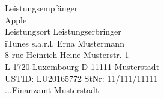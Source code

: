 \documentclass{article}
\begin{document}
\noindent
\pagestyle{empty}
Leistungsempfänger\\
Apple\\
Leistungsort \hfill Leistungserbringer\\
iTunes s.a.r.l. \hfill Erna Mustermann\\
8 rue Heinrich Heine \hfill Musterstr. 1\\
L-1720 Luxembourg \hfill D-11111 Musterstadt\\
USTID: LU20165772 \hfill StNr: 11/111/11111\\
...\hfill Finanzamt Musterstadt\\
\vspace{1cm}

\noindent
\end{document}
